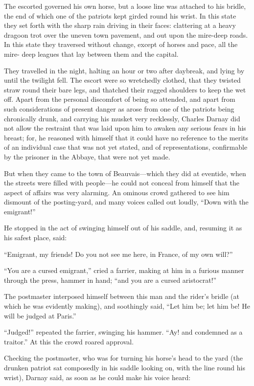 The escorted governed his own horse, but a loose line was attached to
his bridle, the end of which one of the patriots kept girded round
his wrist. In this state they set forth with the sharp rain driving
in their faces:  clattering at a heavy dragoon trot over the uneven
town pavement, and out upon the mire-deep roads.  In this state they
traversed without change, except of horses and pace, all the mire-%
deep leagues that lay between them and the capital.

They travelled in the night, halting an hour or two after daybreak,
and lying by until the twilight fell.  The escort were so wretchedly
clothed, that they twisted straw round their bare legs, and thatched
their ragged shoulders to keep the wet off.  Apart from the personal
discomfort of being so attended, and apart from such considerations
of present danger as arose from one of the patriots being chronically
drunk, and carrying his musket very recklessly, Charles Darnay did
not allow the restraint that was laid upon him to awaken any serious
fears in his breast; for, he reasoned with himself that it could have
no reference to the merits of an individual case that was not yet
stated, and of representations, confirmable by the prisoner in the
Abbaye, that were not yet made.

But when they came to the town of Beauvais---which they did at
eventide, when the streets were filled with people---he could not
conceal from himself that the aspect of affairs was very alarming.
An ominous crowd gathered to see him dismount of the posting-yard,
and many voices called out loudly, ``Down with the emigrant!''

He stopped in the act of swinging himself out of his saddle, and,
resuming it as his safest place, said:

``Emigrant, my friends!  Do you not see me here, in France, of my own will?''

``You are a cursed emigrant,'' cried a farrier, making at him in a
furious manner through the press, hammer in hand; ``and you are a
cursed aristocrat!''

The postmaster interposed himself between this man and the rider's
bridle (at which he was evidently making), and soothingly said,
``Let him be; let him be!  He will be judged at Paris.''

``Judged!'' repeated the farrier, swinging his hammer.
``Ay! and condemned as a traitor.''  At this the crowd roared approval.

Checking the postmaster, who was for turning his horse's head to the
yard (the drunken patriot sat composedly in his saddle looking on,
with the line round his wrist), Darnay said, as soon as he could make
his voice heard:

